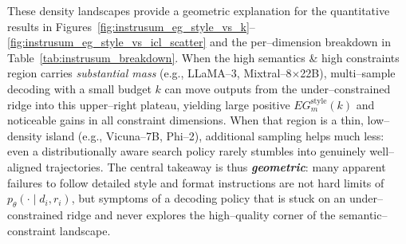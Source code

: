 These density landscapes provide a geometric explanation for the
quantitative results in
Figures~\ref{fig:instrusum_eg_style_vs_k}--%
\ref{fig:instrusum_eg_style_vs_icl_scatter} and the per--dimension
breakdown in Table~\ref{tab:instrusum_breakdown}.  When the
high semantics \& high constraints region carries \emph{substantial
mass} (e.g., LLaMA--3, Mixtral--8$\times$22B), multi--sample decoding
with a small budget $k$ can move outputs from the under--constrained
ridge into this upper--right plateau, yielding large positive
$EG^{\text{style}}_m(k)$ and noticeable gains in all constraint
dimensions.  When that region is a thin, low--density island (e.g.,
Vicuna--7B, Phi--2), additional sampling helps much less: even a
distributionally aware search policy rarely stumbles into genuinely
well--aligned trajectories.  The central takeaway is thus
\emph{\textbf{geometric}}: many apparent failures to follow detailed
style and format instructions are not hard limits of
$p_\theta(\cdot \mid d_i,r_i)$, but symptoms of a decoding policy that
is stuck on an under--constrained ridge and never explores the
high--quality corner of the semantic--constraint landscape.






